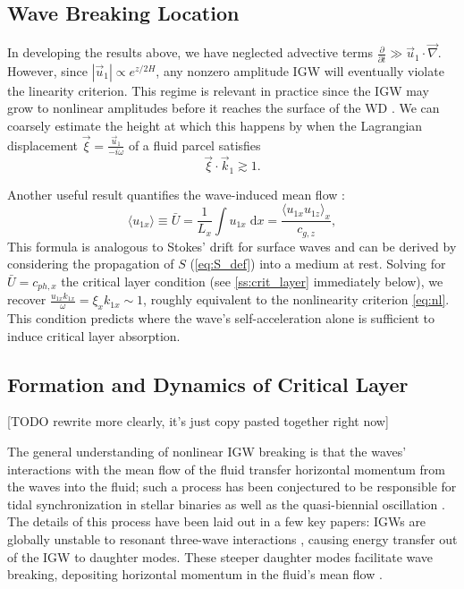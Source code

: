 \documentclass[
        fleqn,
        usenatbib,
    ]{mnras}
\newcommand*{\pd}[2]{\frac{\partial#1}{\partial#2}}
\newcommand*{\abs}[1]{\left|#1\right|}
\newcommand*{\ev}[1]{\langle#1\rangle}
\begin{document}
\subsection{Wave Breaking Location}\label{ss:wave_breaking}

In developing the results above, we have neglected advective terms $\pd{}{t} \gg
\vec{u}_1 \cdot \vec{\nabla}$. However, since $\abs{\vec{u}_1} \propto
e^{z/2H}$, any nonzero amplitude IGW will eventually violate the linearity
criterion. This regime is relevant in practice since the IGW may grow to
nonlinear amplitudes before it reaches the surface of the WD
\citep{fullerI,fullerII}. We can coarsely estimate the height at which this
happens by when the Lagrangian displacement $\vec{\xi} =
\frac{\vec{u}_1}{-i\omega}$ of a fluid parcel satisfies
\begin{equation}
    \vec{\xi} \cdot \vec{k}_1 \gtrsim 1.\label{eq:nl}
\end{equation}

Another useful result quantifies the wave-induced mean flow
\citep{eliassen_palm_cite,sutherland0}:
\begin{equation}
     \ev{u_{1x}} \equiv \bar{U} = \frac{1}{L_x}
        \int\limits u_{1x}\;\mathrm{d}x = \frac{\ev{u_{1x}u_{1z}}_x}{c_{g,z}},
        \label{eq:mean_flow}
\end{equation}
This formula is analogous to Stokes' drift for surface waves and can be derived
by considering the propagation of $S$ (\autoref{eq:S_def}) into a medium at
rest. Solving for $\bar{U} = c_{ph, x}$ the critical layer condition (see
\autoref{ss:crit_layer} immediately below), we recover
$\frac{u_{1x}k_{1x}}{\omega} = \xi_x k_{1x} \sim 1$, roughly equivalent to the
nonlinearity criterion \autoref{eq:nl}. This condition predicts where the wave's
self-acceleration alone is sufficient to induce critical layer absorption.

\subsection{Formation and Dynamics of Critical Layer}\label{ss:crit_layer}

[TODO rewrite more clearly, it's just copy pasted together right now]

The general understanding of nonlinear IGW breaking is that the waves'
interactions with the mean flow of the fluid transfer horizontal momentum from
the waves into the fluid; such a process has been conjectured to be responsible
for tidal synchronization in stellar binaries \citep{zahn75,gn89} as well as the
quasi-biennial oscillation \citep{lindzen_qbo}. The details of this process have
been laid out in a few key papers: IGWs are globally unstable to resonant
three-wave interactions \citep{drazin}, causing energy transfer out of the IGW
to daughter modes. These steeper daughter modes facilitate wave breaking,
depositing horizontal momentum in the fluid's mean flow \citep{klostermeyer}.
\end{document}
